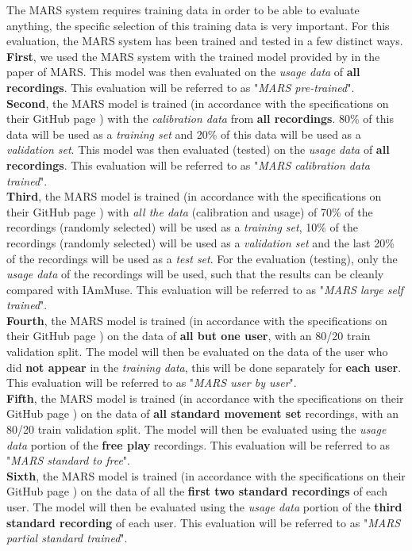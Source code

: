 The MARS system requires training data in order to be able to evaluate anything, the specific selection of this training data is very important.
For this evaluation, the MARS system has been trained and tested in a few distinct ways.\\
\textbf{First}, we used the MARS system with the trained model provided by \citeauthor{an2021mars} in the paper of MARS\cite{an2021mars}. 
This model was then evaluated on the \textit{usage data} of \textbf{all recordings}.
This evaluation will be referred to as "\textit{MARS pre-trained}".\\
\textbf{Second}, the MARS model is trained (in accordance with the specifications on their GitHub page \cite{mars_github}) with the \textit{calibration data} from \textbf{all recordings}.
80\% of this data will be used as a \textit{training set} and 20\% of this data will be used as a \textit{validation set}.
This model was then evaluated (tested) on the \textit{usage data} of \textbf{all recordings}.
This evaluation will be referred to as "\textit{MARS calibration data trained}".\\
\textbf{Third}, the MARS model is trained (in accordance with the specifications on their GitHub page \cite{mars_github}) with \textit{all the data} (calibration and usage) of 70\% of the recordings (randomly selected) will be used as a \textit{training set}, 10\% of the recordings (randomly selected) will be used as a \textit{validation set} and the last 20\% of the recordings will be used as a \textit{test set}.
For the evaluation (testing), only the \textit{usage data} of the recordings will be used, such that the results can be cleanly compared with IAmMuse.
This evaluation will be referred to as "\textit{MARS large self trained}".\\
\textbf{Fourth}, the MARS model is trained (in accordance with the specifications on their GitHub page \cite{mars_github}) on the data of \textbf{all but one user}, with an 80/20 train validation split.
The model will then be evaluated on the data of the user who did \textbf{not appear} in the \textit{training data}, this will be done separately for \textbf{each user}.
This evaluation will be referred to as "\textit{MARS user by user}".\\
\textbf{Fifth}, the MARS model is trained (in accordance with the specifications on their GitHub page \cite{mars_github}) on the data of \textbf{all standard movement set} recordings, with an 80/20 train validation split.
The model will then be evaluated using the \textit{usage data} portion of the \textbf{free play} recordings.
This evaluation will be referred to as "\textit{MARS standard to free}".\\
\textbf{Sixth}, the MARS model is trained (in accordance with the specifications on their GitHub page \cite{mars_github}) on the data of all the \textbf{first two standard recordings} of each user.
The model will then be evaluated using the \textit{usage data} portion of the \textbf{third standard recording} of each user.
This evaluation will be referred to as "\textit{MARS partial standard trained}".\\

